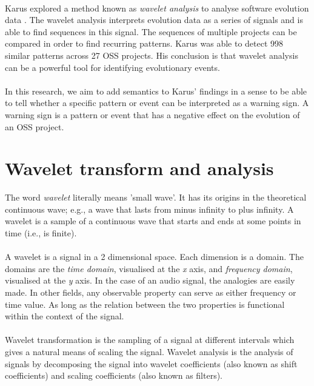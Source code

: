 \paragraph{}
Karus explored a method known as \emph{wavelet analysis }\rm to analyse software
evolution data \cite{karus2013}. The wavelet analysis interprets evolution data
as a series of signals and is able to find sequences in this signal. The
sequences of multiple projects can be compared in order to find recurring
patterns. Karus was able to detect 998 similar patterns across 27 OSS projects.
His conclusion is that wavelet analysis can be a powerful tool for identifying
evolutionary events.

\paragraph{}
In this research, we aim to add semantics to Karus' findings in a sense to be
able to tell whether a specific pattern or event can be interpreted as a
warning sign. A warning sign is a pattern or event that has a negative effect
on the evolution of an OSS project.

\section{Wavelet transform and analysis}
The word \emph{wavelet }\rm literally means 'small wave'. It has its origins in
the theoretical continuous wave; e.g., a wave that lasts from minus infinity
to plus infinity. A wavelet is a sample of a continuous wave that starts and
ends at some points in time (i.e., is finite).

\paragraph{}
A wavelet is a signal in a 2 dimensional space. Each dimension is a domain. The
domains are the \emph{time domain}\rm, visualised at the \emph{x }\rm axis,
and \emph{frequency domain}\rm, visualised at the \emph{y }\rm axis.
In the case of an audio signal, the analogies are easily made. In other fields, any
observable property can serve as either frequency or time value. As long as the
relation between the two properties is functional within the context of the
signal.

\paragraph{}
Wavelet transformation is the sampling of a signal at different intervals which
gives a natural means of scaling the signal. Wavelet analysis is the analysis of
signals by decomposing the signal into wavelet coefficients (also known as shift
coefficients) and scaling coefficients (also known as filters).

